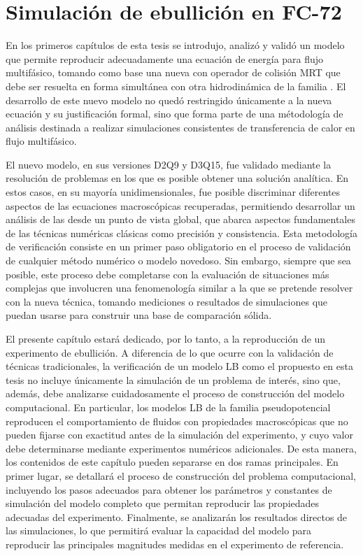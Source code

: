 \chapter{Simulaci\'on de ebullici\'on en FC-72}

En los primeros cap\'itulos de esta tesis se introdujo, analiz\'o y valid\'o un modelo que permite reproducir adecuadamente una ecuaci\'on de energ\'ia para flujo multif\'asico, tomando como base una nueva \lbe{} con operador de colisi\'on MRT que debe ser resuelta en forma simult\'anea con otra \lbe{} hidrodin\'amica de la familia \pp{}. El desarrollo de este nuevo modelo no qued\'o restringido \'unicamente a la nueva ecuaci\'on y su justificaci\'on formal, sino que forma parte de una m\'etodolog\'ia de an\'alisis destinada a realizar simulaciones consistentes de transferencia de calor en flujo multif\'asico.

El nuevo modelo, en sus versiones D2Q9 y D3Q15, fue validado mediante la resoluci\'on de problemas en los que es posible obtener una soluci\'on anal\'itica. En estos casos, en su mayor\'ia unidimensionales, fue posible discriminar diferentes aspectos de las ecuaciones macrosc\'opicas recuperadas, permitiendo desarrollar un an\'alisis de las \lbe{} desde un punto de vista global, que abarca aspectos fundamentales de las t\'ecnicas num\'ericas cl\'asicas como precisi\'on y consistencia. Esta metodolog\'ia de verificaci\'on consiste en un primer paso obligatorio en el proceso de validaci\'on de cualquier m\'etodo num\'erico o modelo novedoso. Sin embargo, siempre que sea posible, este proceso debe completarse con la evaluaci\'on de situaciones m\'as complejas que involucren una fenomenolog\'ia similar a la que se pretende resolver con la nueva t\'ecnica, tomando mediciones o resultados de simulaciones que puedan usarse para construir una base de comparaci\'on s\'olida.

El presente cap\'itulo estar\'a dedicado, por lo tanto, a la reproducci\'on de un experimento de ebullici\'on. A diferencia de lo que ocurre con la validaci\'on de t\'ecnicas tradicionales, la verificaci\'on de un modelo LB como el propuesto en esta tesis no incluye \'unicamente la simulaci\'on de un problema de inter\'es, sino que, adem\'as, debe analizarse cuidadosamente el proceso de construcci\'on del modelo computacional. En particular, los modelos LB de la familia pseudopotencial reproducen el comportamiento de fluidos con propiedades macrosc\'opicas que no pueden fijarse con exactitud antes de la simulaci\'on del experimento, y cuyo valor debe determinarse mediante experimentos num\'ericos adicionales. De esta manera, los contenidos de este cap\'itulo pueden separarse en dos ramas principales. En primer lugar, se detallar\'a el proceso de construcci\'on del problema computacional, incluyendo los pasos adecuados para obtener los par\'ametros y constantes de simulaci\'on del modelo completo que permitan reproducir las propiedades adecuadas del experimento. Finalmente, se analizar\'an los resultados directos de las simulaciones, lo que permitir\'a evaluar la capacidad del modelo para reproducir las principales magnitudes medidas en el experimento de referencia.





